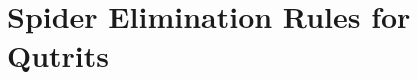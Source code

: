 \documentclass[submission,copyright,creativecommons]{eptcs}
\begin{document}

% 


\appendix



\section{Spider Elimination Rules for Qutrits}




\end{document}
